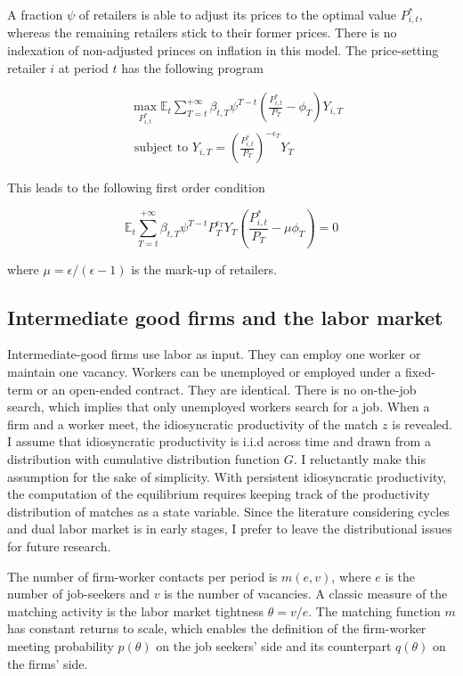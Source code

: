 A fraction $\psi$ of retailers is able to adjust its prices to the optimal value $P_{i,t}^*$, whereas the  remaining retailers stick to their former prices. There is no indexation of non-adjusted princes on inflation in this model. The price-setting retailer $i$ at period $t$ has the following program

\begin{align*}
&\max_{P_{i,t}^*} \mathbb{E}_{t} \sum_{T = t}^{+\infty} \beta_{t,T} \psi^{T-t} \left( \frac{P_{i,t}^*}{P_T} - \phi_{T} \right) Y_{i,T} \\
&\text{ subject to } Y_{i,T} = \left( \frac{P_{i,t}^*}{P_T} \right)^{-\epsilon_T} Y_T
\end{align*}

This leads to the following first order condition

\begin{equation}
\mathbb{E}_{t} \sum_{T = t}^{+\infty} \beta_{t,T} \psi^{T-t} P_T^{\epsilon_T} Y_T \left( \frac{P_{i,t}^*}{P_T} - \mu \phi_T \right) = 0 \label{eq:price_eq}
\end{equation}

where $\mu = \epsilon /(\epsilon-1)$ is the mark-up of retailers.

\subsection{Intermediate good firms and the labor market}

Intermediate-good firms use labor as input. They can employ one worker or maintain one vacancy. Workers can be unemployed or employed under a fixed-term or an open-ended contract. They are identical. There is no on-the-job search, which implies that only unemployed workers search for a job. When a firm and a worker meet, the idiosyncratic productivity of the match $z$ is revealed. I assume that idiosyncratic productivity is i.i.d across time and drawn from a distribution with cumulative distribution function $G$. I reluctantly make this assumption for the sake of simplicity. With persistent idiosyncratic productivity, the computation of the equilibrium requires keeping track of the productivity distribution of matches as a state variable. Since the literature considering cycles and dual labor market is in early stages, I prefer to leave the distributional issues for future research. 

The number of firm-worker contacts per period is $m(e,v)$, where $e$ is the number of job-seekers and $v$ is the number of vacancies. A classic measure of the matching activity is the labor market tightness $\theta =  v/e$. The matching function $m$ has constant returns to scale, which enables the definition of the firm-worker meeting probability $p(\theta)$ on the job seekers' side and its counterpart $q(\theta)$ on the firms' side.

